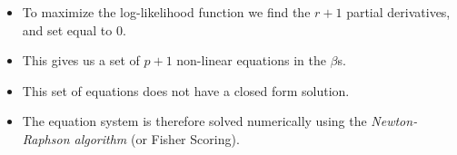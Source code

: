 \documentclass[10pt,ignorenonframetext,]{beamer}
\begin{document}
\begin{frame}

\begin{itemize}
\item
  To maximize the log-likelihood function we find the \(r+1\) partial
  derivatives, and set equal to 0.
\item
  This gives us a set of \(p+1\) non-linear equations in the \(\beta\)s.
\item
  This set of equations does not have a closed form solution.
\item
  The equation system is therefore solved numerically using the
  \emph{Newton-Raphson algorithm} (or Fisher Scoring).
\end{itemize}

\end{frame}
\end{document}
